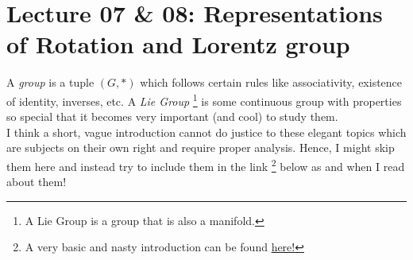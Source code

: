 
\section*{Lecture 07 \& 08: Representations of Rotation and Lorentz group}
A \textit{group} is a tuple $(G,*)$ which follows certain rules like associativity, existence of identity, inverses, etc. 
A \textit{Lie Group} \footnote{A Lie Group is a group that is also a manifold.} is some continuous group with properties so special that it becomes very important (and cool) to study them.\\[0.2cm] I think a short, vague introduction cannot do justice to these elegant topics which are subjects on their own right and require proper analysis. Hence, I might skip them here and instead try to include them in the link \footnote{A very basic and nasty introduction can be found \href{https://raw.githubusercontent.com/LoneWolf1304/Notes/main/Lie-Algebra/main.pdf}{here!}} below as and when I read about them!
